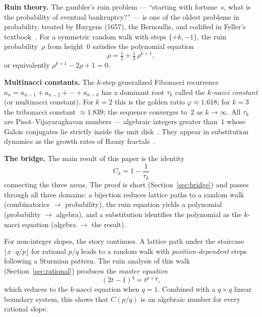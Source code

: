 \documentclass[11pt]{article}
\theoremstyle{definition}
\theoremstyle{remark}
\newcommand{\floor}[1]{\lfloor #1 \rfloor}
\begin{document}
\medskip\noindent\textbf{Ruin theory.}
The gambler's ruin problem --- ``starting with fortune~$s$, what is the
probability of eventual bankruptcy?'' --- is one of the oldest problems
in probability, treated by Huygens (1657), the Bernoullis, and
codified in Feller's textbook~\cite{Feller1968}.
For a symmetric random walk with steps $\{+k, -1\}$, the ruin
probability~$\rho$ from height~$0$ satisfies the polynomial equation
\begin{equation}\label{eq:ruin-intro}
\rho = \tfrac{1}{2} + \tfrac{1}{2}\,\rho^{k+1},
\end{equation}
or equivalently $\rho^{k+1} - 2\rho + 1 = 0$.

\medskip\noindent\textbf{Multinacci constants.}
The $k$-step generalized Fibonacci recurrence $a_n = a_{n-1} + a_{n-2}
+ \cdots + a_{n-k}$ has a dominant root $\tau_k$ called the
\emph{$k$-nacci constant} (or multinacci constant).
For $k = 2$ this is the golden ratio $\varphi \approx 1.618$;
for $k = 3$ the tribonacci constant $\approx 1.839$; the sequence
converges to~$2$ as $k \to \infty$.
All $\tau_k$ are Pisot--Vijayaraghavan numbers --- algebraic integers
greater than~$1$ whose Galois conjugates lie strictly inside the unit
disk~\cite{Miles1960, DresdenDu2014}.
They appear in substitution dynamics as the growth rates of Rauzy
fractals~\cite{Rauzy1982, Fogg2002}.

\medskip\noindent\textbf{The bridge.}
The main result of this paper is the identity
\begin{equation}\label{eq:bridge-intro}
\boxed{C_k = 1 - \frac{1}{\tau_k}}
\end{equation}
connecting the three areas.
The proof is short (Section~\ref{sec:bridge}) and passes through all
three domains: a bijection reduces lattice paths to a random walk
(combinatorics $\to$ probability), the ruin equation yields a
polynomial (probability $\to$ algebra), and a substitution identifies
the polynomial as the $k$-nacci equation (algebra $\to$ the result).

For non-integer slopes, the story continues.
A lattice path under the staircase $\floor{x \cdot q/p}$ for rational
$p/q$ leads to a random walk with \emph{position-dependent} steps
following a Sturmian pattern.
The ruin analysis of this walk
(Section~\ref{sec:rational}) produces the \emph{master equation}
\begin{equation}\label{eq:master-intro}
(2t - 1)^q = t^{p+q},
\end{equation}
which reduces to the $k$-nacci equation when $q = 1$.
Combined with a $q \times q$ linear boundary system, this shows that
$C(p/q)$ is an algebraic number for every rational slope.
\end{document}
